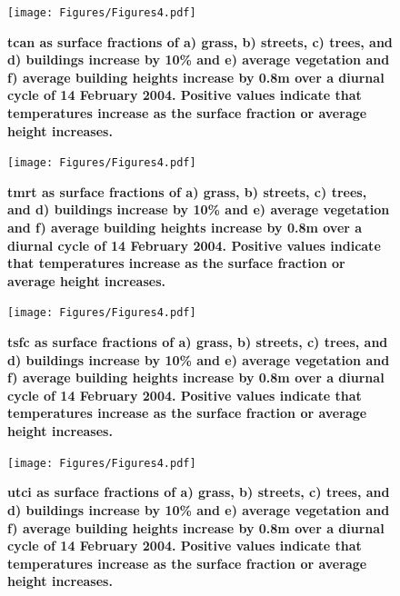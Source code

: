 \documentclass[final,3p,times,authoryear]{elsarticle}
\begin{document}


\begin{figure}
\centering
\texttt{[image: Figures/Figures4.pdf]}
\caption{\bf \gls{tcan} as surface fractions of a) grass, b) streets, c) trees, and d) buildings increase by 10\% and e) average vegetation and f) average building heights increase by 0.8m over a diurnal cycle of 14 February 2004. Positive values indicate that temperatures increase as the surface fraction or average height increases. }
 \label{fig:tcanday}
\end{figure}

\begin{figure}
\centering
\texttt{[image: Figures/Figures4.pdf]}
\caption{\bf \gls{tmrt} as surface fractions of a) grass, b) streets, c) trees, and d) buildings increase by 10\% and e) average vegetation and f) average building heights increase by 0.8m over a diurnal cycle of 14 February 2004. Positive values indicate that temperatures increase as the surface fraction or average height increases. }
 \label{fig:tmrtday}
\end{figure}

\begin{figure}
\centering
\texttt{[image: Figures/Figures4.pdf]}
\caption{\bf \gls{tsfc} as surface fractions of a) grass, b) streets, c) trees, and d) buildings increase by 10\% and e) average vegetation and f) average building heights increase by 0.8m over a diurnal cycle of 14 February 2004. Positive values indicate that temperatures increase as the surface fraction or average height increases. }
 \label{fig:tsfcday}
\end{figure}

\begin{figure}
\centering
\texttt{[image: Figures/Figures4.pdf]}
\caption{\bf \gls{utci} as surface fractions of a) grass, b) streets, c) trees, and d) buildings increase by 10\% and e) average vegetation and f) average building heights increase by 0.8m over a diurnal cycle of 14 February 2004. Positive values indicate that temperatures increase as the surface fraction or average height increases. }
 \label{fig:utciday}
\end{figure}
\end{document}
